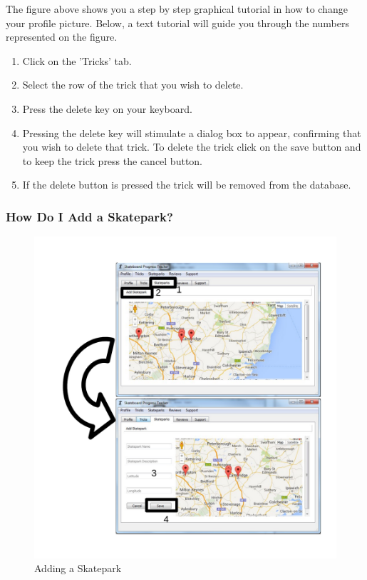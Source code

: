 The figure above shows you a step by step graphical tutorial in how to change your profile picture. Below, a text tutorial will guide you through the numbers represented on the figure.

\begin{enumerate}
\item Click on the 'Tricks' tab.
\item Select the row of the trick that you wish to delete.
\item Press the delete key on your keyboard.
\item Pressing the delete key will stimulate a dialog box to appear, confirming that you wish to delete that trick. To delete the trick click on the save button and to keep the trick press the cancel button.
\item If the delete button is pressed the trick will be removed from the database.
\end{enumerate}

\subsubsection{How Do I Add a Skatepark?}

\begin{figure}[H]
    \includegraphics[width=\textwidth]{./Manual/Images/AddSkatepark.pdf}
    \caption{Adding a Skatepark} \label{fig:Add Skatepark}
\end{figure}

